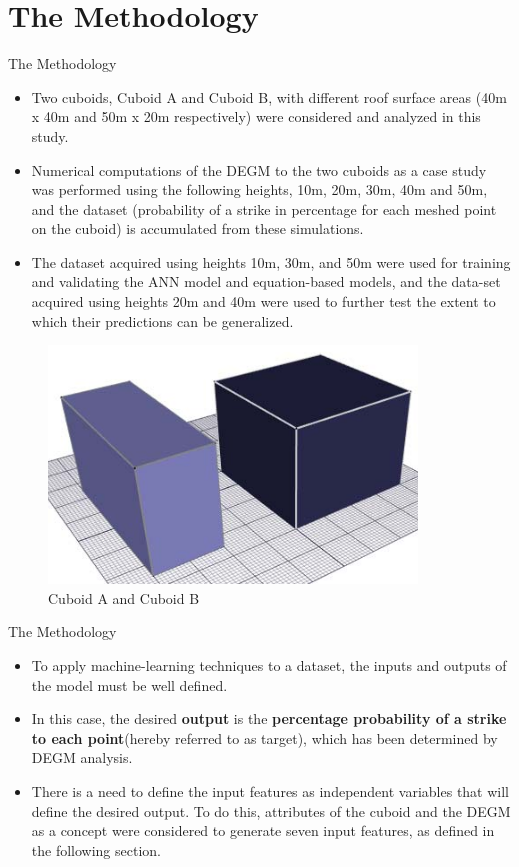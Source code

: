 \documentclass{beamer}
\begin{document}
\section{The Methodology}
\begin{frame}{The Methodology}\vspace{-1mm}
    \begin{itemize}
        \justifying
        \item Two cuboids, Cuboid A and Cuboid B, with different roof surface areas (40m x 40m and 50m x 20m respectively) were considered and analyzed in this study. 
        \item Numerical computations of the DEGM to the two cuboids as a case study was performed using the following heights, 10m, 20m, 30m, 40m and 50m, and the dataset (probability of a strike in percentage for each meshed point on the cuboid) is accumulated from these simulations.
        \item The dataset acquired using heights 10m, 30m, and 50m were used for training and validating the ANN model and equation-based models, and the data-set acquired using heights 20m and 40m were used to further test the extent to which their predictions can be generalized.
    \end{itemize}
    \vspace{-2mm}
    \begin{figure}
        \centering
        \includegraphics[width=0.28\columnwidth]{Figures/Cuboid_A_B.png}
        \caption{Cuboid A and Cuboid B}
        \label{Cuboid_A_B}
    \end{figure}
\end{frame}

\begin{frame}{The Methodology}
    \begin{itemize}
        \justifying
        \item To apply machine-learning techniques to a dataset, the inputs and outputs of the model must be well defined.
        \item In this case, the desired \textbf{output} is the \textbf{percentage probability of a strike to each point}(hereby referred to as target), which has been determined by DEGM analysis.
        \item There is a need to define the input features as independent variables that will define the desired output. To do this, attributes of the cuboid and the DEGM as a concept were considered to generate seven input features, as defined in the following section.
    \end{itemize}
\end{frame}
\end{document}
